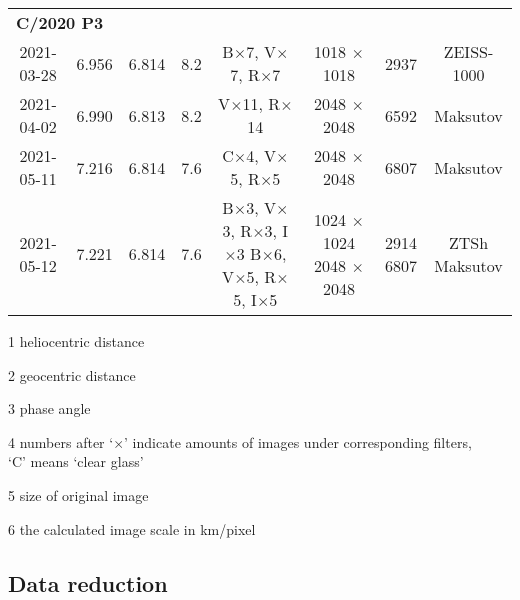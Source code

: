 \begin{table}
\begin{threeparttable}
{\begin{tabular}{cccccccc}
            \multicolumn{8}{l}{\textbf{C/2020 P3}} \\
            2021-03-28 & 6.956 & 6.814 & 8.2 & B$\times$7, V$\times$7, R$\times$7 & 1018 $\times$ 1018 & 2937 & ZEISS-1000 \\
            2021-04-02 & 6.990 & 6.813 & 8.2 & V$\times$11, R$\times$14 & 2048 $\times$ 2048 & 6592 & Maksutov \\
            2021-05-11 & 7.216 & 6.814 & 7.6 & C$\times$4, V$\times$5, R$\times$5 & 2048 $\times$ 2048 & 6807 & Maksutov \\
            2021-05-12 & 7.221 & 6.814 & 7.6 & \makecell[c]{B$\times$3, V$\times$3, R$\times$3, I$\times$3 \\ B$\times$6, V$\times$5, R$\times$5, I$\times$5} & \makecell[c]{1024 $\times$ 1024 \\ 2048 $\times$ 2048}  & \makecell[c]{2914 \\ 6807} & \makecell[c]{ZTSh \\ Maksutov} \\
            \bottomrule
        \end{tabular}
        }
        \begin{tablenotes}
            \item[1] heliocentric distance
            \item[2] geocentric distance
            \item[3] phase angle
            \item[4] numbers after `$\times$' indicate amounts of images under corresponding filters, \\
            `C' means `clear glass'
            \item[5] size of original image
            \item[6] the calculated image scale in \si{\km/pixel}
        \end{tablenotes}
    \end{threeparttable}
\end{table}

\subsection{Data reduction}

